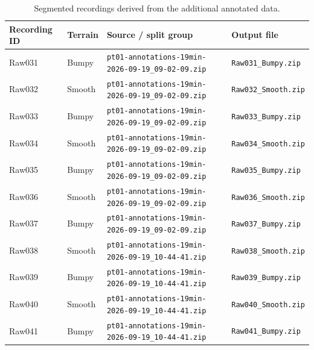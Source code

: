 \begin{table}[htbp]
\centering
\footnotesize
\caption{Segmented recordings derived from the additional annotated data.}
\label{tab:annotated-recordings}
\begin{tabularx}{\linewidth}{@{}l l X l@{}}
\toprule
Recording ID & Terrain & Source / split group & Output file \\
\midrule
Raw031 & Bumpy  &
\texttt{pt01-annotations-19min-2026-09-19\_09-02-09.zip} &
\texttt{Raw031\_Bumpy.zip} \\

Raw032 & Smooth &
\texttt{pt01-annotations-19min-2026-09-19\_09-02-09.zip} &
\texttt{Raw032\_Smooth.zip} \\

Raw033 & Bumpy  &
\texttt{pt01-annotations-19min-2026-09-19\_09-02-09.zip} &
\texttt{Raw033\_Bumpy.zip} \\

Raw034 & Smooth &
\texttt{pt01-annotations-19min-2026-09-19\_09-02-09.zip} &
\texttt{Raw034\_Smooth.zip} \\

Raw035 & Bumpy  &
\texttt{pt01-annotations-19min-2026-09-19\_09-02-09.zip} &
\texttt{Raw035\_Bumpy.zip} \\

Raw036 & Smooth &
\texttt{pt01-annotations-19min-2026-09-19\_09-02-09.zip} &
\texttt{Raw036\_Smooth.zip} \\

Raw037 & Bumpy  &
\texttt{pt01-annotations-19min-2026-09-19\_09-02-09.zip} &
\texttt{Raw037\_Bumpy.zip} \\

Raw038 & Smooth &
\texttt{pt01-annotations-19min-2026-09-19\_10-44-41.zip} &
\texttt{Raw038\_Smooth.zip} \\

Raw039 & Bumpy  &
\texttt{pt01-annotations-19min-2026-09-19\_10-44-41.zip} &
\texttt{Raw039\_Bumpy.zip} \\

Raw040 & Smooth &
\texttt{pt01-annotations-19min-2026-09-19\_10-44-41.zip} &
\texttt{Raw040\_Smooth.zip} \\

Raw041 & Bumpy  &
\texttt{pt01-annotations-19min-2026-09-19\_10-44-41.zip} &
\texttt{Raw041\_Bumpy.zip} \\
\bottomrule
\end{tabularx}
\end{table}
